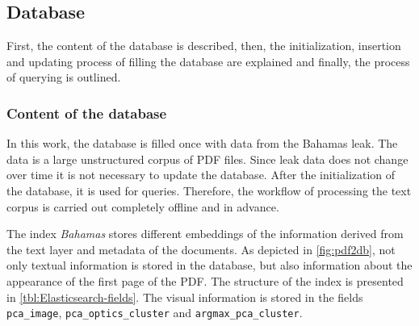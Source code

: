 \subsection{Database}\label{subsec:impl-db}
First, the content of the \databaseName{} database is described, then, the initialization, insertion and updating process of filling the database are explained 
and finally, the process of querying is outlined.

\subsubsection*{Content of the database}
In this work, the database is filled once with data from the Bahamas leak.
The data is a large unstructured corpus of PDF files.
Since leak data does not change over time it is not necessary to update the database.
After the initialization of the database, it is used for queries. 
Therefore, the workflow of processing the text corpus is carried out completely offline and in advance.

The index \textit{Bahamas} stores different embeddings of the information derived from the text layer and metadata of the documents.
As depicted in \autoref{fig:pdf2db}, not only textual information is stored in the database, 
but also information about the appearance of the first page of the PDF.
The structure of the index is presented in \autoref{tbl:Elasticsearch-fields}.
The visual information is stored in the fields \texttt{pca\_image}, \texttt{pca\_optics\_cluster} and \texttt{argmax\_pca\_cluster}.

